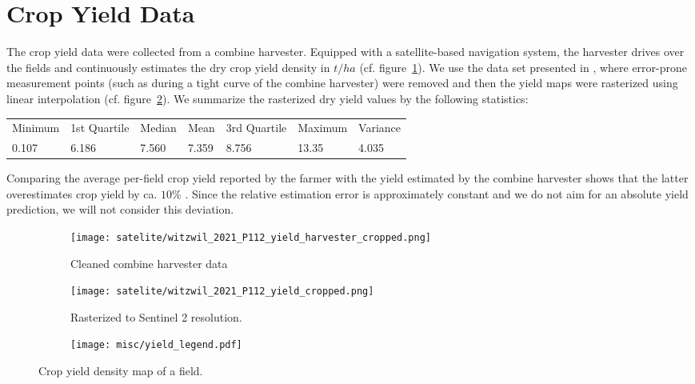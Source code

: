 \section{Crop Yield Data}{
	\label{sec:yieldmapping_data}
	The crop yield data were collected from a combine harvester. Equipped with a satellite-based navigation system, the harvester drives over the fields and continuously estimates the dry crop yield density in $t/ha$ (cf. figure~\ref{fig:satelite/witzwil_2021_P112_yield_harvester_cropped}). 
	We use the data set presented in \cite{perichPixelbasedCropYield2022}, where error-prone measurement points (such as during a tight curve of the combine harvester) were removed and then the yield maps were rasterized using linear interpolation (cf. figure~\ref{fig:satelite/witzwil_2021_P112_yield_cropped.png}). We summarize the rasterized dry yield values by the following statistics:

	\begin{tabular}{l l l l l l l} 
		Minimum & 1st Quartile & Median & Mean  & 3rd Quartile & Maximum & Variance \\
		0.107   & 6.186        & 7.560  & 7.359 & 8.756        & 13.35   & 4.035
	\end{tabular}    

	Comparing the average per-field crop yield reported by the farmer with the yield estimated by the combine harvester shows that the latter overestimates crop yield by ca. $10\%$ \citep{perichPixelbasedCropYield2022}. Since the relative estimation error is approximately constant and we do not aim for an absolute yield prediction, we will not consider this deviation. 



	\begin{figure}
		\centering
		\begin{subfigure}{.42\textwidth}
			\centering
			\texttt{[image: satelite/witzwil\_2021\_P112\_yield\_harvester\_cropped.png]}
			\caption{\small Cleaned combine harvester data}
			\label{fig:satelite/witzwil_2021_P112_yield_harvester_cropped}
		\end{subfigure}%
		\begin{subfigure}{.42\textwidth}
			\centering
			\texttt{[image: satelite/witzwil\_2021\_P112\_yield\_cropped.png]}
			\caption{\small Rasterized to Sentinel 2 resolution.}
			\label{fig:satelite/witzwil_2021_P112_yield_cropped.png}
		\end{subfigure}
		\begin{subfigure}{.14\textwidth}
			\centering
			\texttt{[image: misc/yield\_legend.pdf]}
			\vspace{0.5cm}
		\end{subfigure}
		\vspace{0.2cm}
		\caption[Crop yield density map of a field]{Crop yield density map of a field. }
		\label{fig:satelite_witzwil_yield}
	\end{figure}
}

